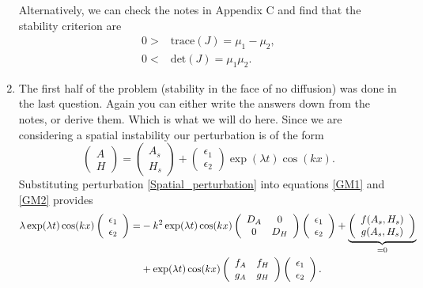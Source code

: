 \documentclass[10pt]{article}
\newcommand{\bb}{\begin{equation}}
\newcommand{\ee}{\end{equation}}
\newcommand{\UB}[2]{\underbrace{#1}_{\textrm{\parbox{8em}{\centering #2}}}}
\newcommand{\eqns}[2]{equations \eqref{#1} and \eqref{#2}}
\renewcommand{\l}{\left(}
\renewcommand{\r}{\right)}
\begin{document}
\begin{Answ}
\begin{enumerate}
Alternatively,  we can check the notes in Appendix C and find that the stability criterion are
\begin{align}
0>&\text{trace}(J)=\mu_{{1}}-\mu_{{2}},\\
0<&\text{det}(J)=\mu_1\mu_2.
\end{align}

\item The first half of the problem (stability in the face of no diffusion) was done in the last question. Again you can either write the answers down from the notes, or derive them. Which is what we will do here. Since we are considering a spatial instability our perturbation is of the form
\bb
\l\begin {array}{c} A \\ H\end {array} \r=\l\begin {array}{c} A_s \\ H_s \end {array} \r+\l\begin {array}{c} \epsilon_1 \\ \epsilon_2\end {array} \r\exp(\lambda t)\cos(kx).\label{Spatial_perturbation}
\ee
Substituting perturbation \eqref{Spatial_perturbation} into \eqns{GM1}{GM2} provides
\begin{align}
\lambda\exp(\lambda t)\cos(kx)\l\begin {array}{c} \epsilon_1 \\ \epsilon_2\end {array} \r=&
-k^2\exp(\lambda t)\cos(kx)\l\begin {array}{cc} D_A & 0 \\ 0 & D_H\end {array} \r\l\begin {array}{c} \epsilon_1 \\ \epsilon_2\end {array} \r+\UB{\l\begin {array}{c} f(A_s,H_s) \\ g(A_s,H_s)\end {array} \r}{=0}\\
&+\exp(\lambda t)\cos(kx)\l\begin {array}{cc} f_A & f_H \\ g_A & g_H\end {array} \r\l\begin {array}{c} \epsilon_1 \\ \epsilon_2\end {array} \r.

\end{align}
\end{enumerate}
\end{Answ}
\end{document}
